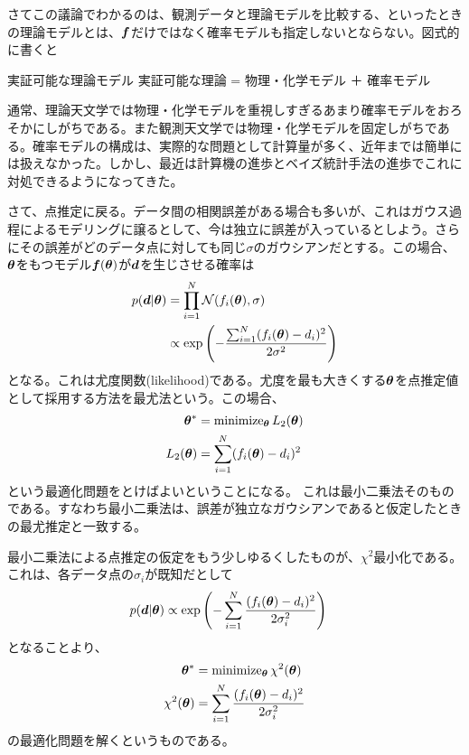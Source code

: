 さてこの議論でわかるのは、観測データと理論モデルを比較する、といったときの理論モデルとは、$\boldsymbol{f}$だけではなく確率モデルも指定しないとならない。図式的に書くと
\begin{itembox}{実証可能な理論モデル}
 実証可能な理論 = 物理・化学モデル ＋ 確率モデル
\end{itembox}

通常、理論天文学では物理・化学モデルを重視しすぎるあまり確率モデルをおろそかにしがちである。また観測天文学では物理・化学モデルを固定しがちである。確率モデルの構成は、実際的な問題として計算量が多く、近年までは簡単には扱えなかった。しかし、最近は計算機の進歩とベイズ統計手法の進歩でこれに対処できるようになってきた。

さて、点推定に戻る。データ間の相関誤差がある場合も多いが、これはガウス過程によるモデリングに譲るとして、今は独立に誤差が入っているとしよう。さらにその誤差がどのデータ点に対しても同じ$\sigma$のガウシアンだとする。この場合、$\boldsymbol{\theta}$をもつモデル$\boldsymbol{f}(\boldsymbol{\theta})$が$\boldsymbol{d}$を生じさせる確率は
\begin{align}
    p(\boldsymbol{d}|\boldsymbol{\theta}) &= \prod_{i=1}^N \mathcal{N} (f_i(\boldsymbol{\theta}), \sigma ) \\
    &\propto \exp{\left( - \dfrac{\sum_{i=1}^N (f_i(\boldsymbol{\theta}) - d_i)^2 }{2 \sigma^2}\right)}
\end{align}
となる。これは尤度関数(likelihood)である。尤度を最も大きくする$\boldsymbol{\theta}$を点推定値として採用する方法を最尤法という。この場合、
\begin{align}
    \boldsymbol{\theta}^\ast &= \mathrm{minimize}_{\boldsymbol{\theta}} \, L_2(\boldsymbol{\theta}) \\
    L_2(\boldsymbol{\theta}) &= \sum_{i=1}^N (f_i(\boldsymbol{\theta}) - d_i)^2 
\end{align}
という最適化問題をとけばよいということになる。
これは最小二乗法そのものである。すなわち最小二乗法は、誤差が独立なガウシアンであると仮定したときの最尤推定と一致する。


最小二乗法による点推定の仮定をもう少しゆるくしたものが、$\chi^2$最小化である。これは、各データ点の$\sigma_i$が既知だとして
\begin{align}
    p(\boldsymbol{d}|\boldsymbol{\theta}) &\propto \exp{\left( - \sum_{i=1}^N \dfrac{ (f_i(\boldsymbol{\theta}) - d_i)^2 }{2 \sigma_i^2}\right)}
\end{align}
となることより、
\begin{align}
    \boldsymbol{\theta}^\ast &= \mathrm{minimize}_{\boldsymbol{\theta}} \, \chi^2(\boldsymbol{\theta}) \\
    \chi^2(\boldsymbol{\theta}) &= \sum_{i=1}^N \dfrac{ (f_i(\boldsymbol{\theta}) - d_i)^2 }{2 \sigma_i^2}
\end{align}
の最適化問題を解くというものである。

